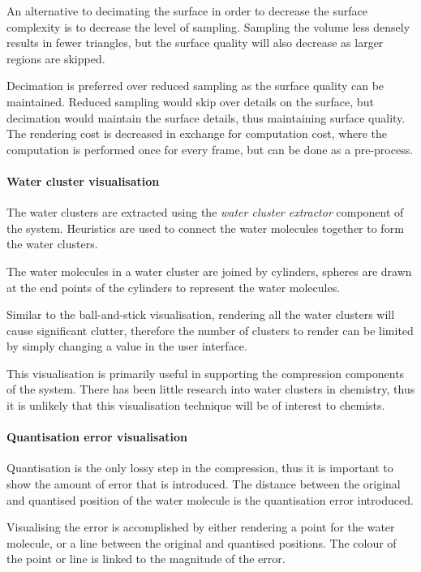 An alternative to decimating the surface in order to decrease the surface
complexity is to decrease the level of sampling. Sampling the volume less
densely results in fewer triangles, but the surface quality will also decrease
as larger regions are skipped.

Decimation is preferred over reduced sampling as the surface quality can be
maintained. Reduced sampling would skip over details on the surface, but
decimation would maintain the surface details, thus maintaining surface
quality. The rendering cost is decreased in exchange for computation cost,
where the computation is performed once for every frame, but can be done as a
pre-process.


\paragraph{Water cluster visualisation}

The water clusters are extracted using the \emph{water cluster extractor}
component of the system. Heuristics are used to connect the water molecules
together to form the water clusters.

The water molecules in a water cluster are joined by cylinders, spheres are
drawn at the end points of the cylinders to represent the water molecules.

Similar to the ball-and-stick visualisation, rendering all the water clusters
will cause significant clutter, therefore the number of clusters to render can
be limited by simply changing a value in the user interface.

This visualisation is primarily useful in supporting the compression components
of the system. There has been little research into water clusters in chemistry,
thus it is unlikely that this visualisation technique will be of interest to
chemists.


\paragraph{Quantisation error visualisation}

Quantisation is the only lossy step in the compression, thus it is important to
show the amount of error that is introduced. The distance between the original
and quantised position of the water molecule is the quantisation error
introduced.

Visualising the error is accomplished by either rendering a point for the water
molecule, or a line between the original and quantised positions. The colour of
the point or line is linked to the magnitude of the error.

